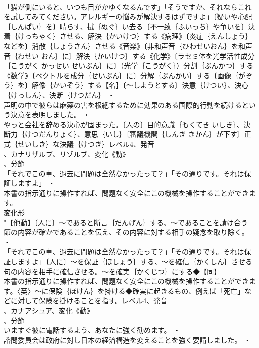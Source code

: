 \documentclass[8pt]{extreport}
\begin{document}
\begin{CJK}{UTF8}{min}
\\	「猫が側にいると、いつも目がかゆくなるんです」「そうですか、それならこれを試してみてください。アレルギーの悩みが解決するはずですよ」〔疑いや心配｛しんぱい｝を〕晴らす、拭｛ぬぐ｝い去る〔不一致｛ふいっち｝や争いを〕決着｛けっちゃく｝させる、解決｛かいけつ｝する《病理》〔炎症｛えんしょう｝などを〕消散｛しょうさん｝させる《音楽》〔非和声音｛ひわせいおん｝を和声音｛わせい おん｝に〕解決｛かいけつ｝する《化学》〔ラセミ体を光学活性成分｛こうがく かっせい せいぶん｝に〕（光学｛こうがく｝）分割｛ぶんかつ｝する《数学》〔ベクトルを成分｛せいぶん｝に〕分解｛ぶんかい｝する〔画像｛がぞう｝を〕解像｛かいぞう｝する【名】〔～しようとする〕決意｛けつい｝、決心｛けっしん｝、決断｛けつだん｝ ・
\\	声明の中で彼らは麻薬の害を根絶するために効果のある国際的行動を続けるという決意を表明しました。 ・
\\	やっと会社を辞める決心が固まった。〔人の〕目的意識｛もくてき いしき｝、決断力｛けつだんりょく｝、意思｛いし｝〔審議機関｛しんぎ きかん｝が下す〕正式｛せいしき｝な決議｛けつぎ｝レベル4、発音
\\	、カナリザルブ、リゾルブ、変化《動》
\\	、分節
\\	「それでこの車、過去に問題は全然なかったって？」「その通りです。それは保証しますよ」 ・
\\	本書の指示通りに操作すれば、問題なく安全にこの機械を操作することができます。
\\	変化形 
\\	"【他動】〔人に〕～であると断言｛だんげん｝する、～であることを請け合う
\\	節の内容が確かであることを伝え、その内容に対する相手の疑念を取り除く。 ・
\\	「それでこの車、過去に問題は全然なかったって？」「その通りです。それは保証しますよ」〔人に〕～を保証｛ほしょう｝する、～を確信｛かくしん｝させる
\\	句の内容を相手に確信させる。～を確実｛かくじつ｝にする◆【同】
\\	本書の指示通りに操作すれば、問題なく安全にこの機械を操作することができます。〈英〉～に保険｛ほけん｝を掛ける◆確実に起きるもの、例えば「死亡」などに対して保険を掛けることを指す。レベル4、発音
\\	、カナアシュア、変化《動》
\\	、分節
\\	いますぐ彼に電話するよう、あなたに強く勧めます。 ・
\\	諮問委員会は政府に対し日本の経済構造を変えることを強く要請しました。 ・

\end{CJK}
\end{document}
